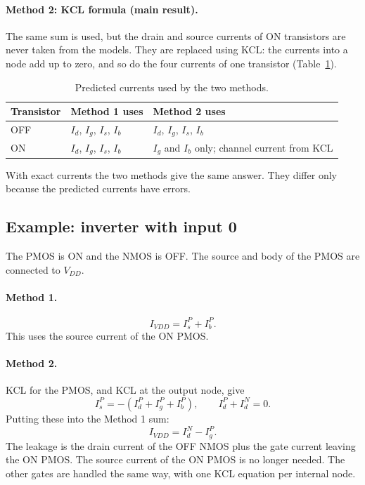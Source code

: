 \documentclass[11pt]{article}
\begin{document}
\paragraph{Method 2: KCL formula (main result).}
The same sum is used, but the drain and source currents of ON transistors
are never taken from the models. They are replaced using KCL: the currents
into a node add up to zero, and so do the four currents of one transistor
(Table~\ref{tab:used}).

\begin{table}[H]
\centering
\begin{tabular}{lll}
\toprule
Transistor & Method 1 uses & Method 2 uses \\
\midrule
OFF & $I_d$, $I_g$, $I_s$, $I_b$ & $I_d$, $I_g$, $I_s$, $I_b$ \\
ON  & $I_d$, $I_g$, $I_s$, $I_b$ & $I_g$ and $I_b$ only; channel current from KCL \\
\bottomrule
\end{tabular}
\caption{Predicted currents used by the two methods.}
\label{tab:used}
\end{table}

With exact currents the two methods give the same answer. They differ only
because the predicted currents have errors.

\subsection{Example: inverter with input 0}

The PMOS is ON and the NMOS is OFF. The source and body of the PMOS are
connected to $V_{DD}$.

\paragraph{Method 1.}
\begin{equation}
I_{VDD} = I_s^{P} + I_b^{P}.
\end{equation}
This uses the source current of the ON PMOS.

\paragraph{Method 2.}
KCL for the PMOS, and KCL at the output node, give
\begin{equation}
I_s^{P} = -\left(I_d^{P} + I_g^{P} + I_b^{P}\right), \qquad
I_d^{P} + I_d^{N} = 0.
\end{equation}
Putting these into the Method 1 sum:
\begin{equation}
I_{VDD} = I_d^{N} - I_g^{P}.
\end{equation}
The leakage is the drain current of the OFF NMOS plus the gate current
leaving the ON PMOS. The source current of the ON PMOS is no longer needed.
The other gates are handled the same way, with one KCL equation per internal
node.
\end{document}
